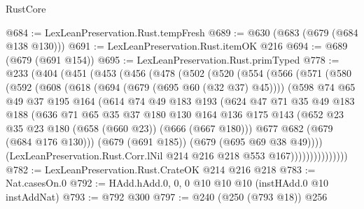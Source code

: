 \begin{lexlean}{RustCore}
\begin{coremodule}
@684 := LexLeanPreservation.Rust.tempFresh
@689 := @630 (@683 (@679 (@684 @138 @130)))
@691 := LexLeanPreservation.Rust.itemOK @216
@694 := @689 (@679 (@691 @154))
@695 := LexLeanPreservation.Rust.primTyped
@778 := @233
    (@404
      (@451
        (@453
          (@456
            (@478
              (@502
                (@520
                  (@554
                    (@566
                      (@571
                        (@580
                          (@592
                            (@608
                              (@618 (@694 (@679 (@695 @60 (@32 @37) @45))))
                              (@598
                                @74
                                @65
                                @49
                                @37
                                @195
                                @164
                                (@614
                                  @74
                                  @49
                                  @183
                                  @193
                                  (@624
                                    @47
                                    @71
                                    @35
                                    @49
                                    @183
                                    @188
                                    (@636
                                      @71
                                      @65
                                      @35
                                      @37
                                      @180
                                      @130
                                      @164
                                      @136
                                      @175
                                      @143
                                      (@652 @23 @35 @23 @180 (@658 (@660 @23)) (@666 (@667 @180)))
                                      @677
                                      @682
                                      (@679 (@684 @176 @130)))
                                    (@679 (@691 @185))
                                    (@679 (@695 @69 @38 @49))))
                                (LexLeanPreservation.Rust.Corr.lNil
                                  @214
                                  @216
                                  @218
                                  @553
                                  @167)))))))))))))))
@782 := LexLeanPreservation.Rust.CrateOK @214 @216 @218
@783 := Nat.casesOn.{0}
@792 := HAdd.hAdd.{0, 0, 0} @10 @10 @10 (instHAdd.{0} @10 instAddNat)
@793 := @792 @300
@797 := @240 (@250 (@793 @18)) @256

\end{coremodule}
\end{lexlean}
